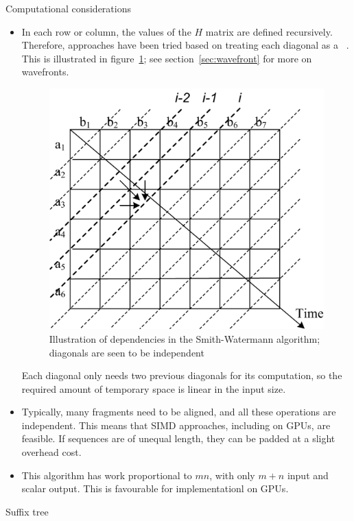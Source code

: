 Computational considerations
\begin{itemize}
\item In each row or column, the values of the $H$ matrix are defined
  recursively. Therefore, approaches have been tried based on treating
  each diagonal as a ~\cite{Liu:cudasw2009}.
  This is illustrated in figure~\ref{fig:sw-diagonal};
  see section~\ref{sec:wavefront} for more on wavefronts.
  \begin{figure}
  \includegraphics{graphics/smith-watermann-diagonal}
  \caption{Illustration of dependencies in the Smith-Watermann algorithm; diagonals are seen to be independent}
  \label{fig:sw-diagonal}  
  \end{figure}
  Each diagonal only needs two previous diagonals for its computation,
  so the required amount of temporary space is linear in the input size.
\item Typically, many fragments need to be aligned, and all these
  operations are independent. This means that SIMD approaches,
  including on \acp{GPU}, are feasible. If sequences are of unequal
  length, they can be padded at a slight overhead cost.
\item This algorithm has work proportional to $mn$, with only $m+n$
  input and scalar output. This is favourable for implementationl on
  \acp{GPU}.
\end{itemize}

 {Suffix tree}

